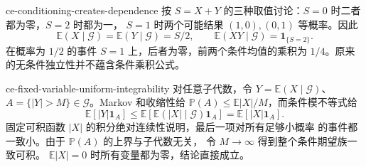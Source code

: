 \begin{solution}{ce-conditioning-creates-dependence}
按 $S=X+Y$ 的三种取值讨论：$S=0$ 时二者都为零，$S=2$ 时都为一，
$S=1$ 时两个可能结果 $(1,0),(0,1)$ 等概率。因此
\[
 \mathbb E(X\mid\mathcal G)=\mathbb E(Y\mid\mathcal G)=S/2,
 \qquad \mathbb E(XY\mid\mathcal G)=\mathbf1_{\{S=2\}}.
\]
在概率为 $1/2$ 的事件 $S=1$ 上，后者为零，前两个条件均值的乘积为
$1/4$。原来的无条件独立性并不蕴含条件乘积公式。
\end{solution}

\begin{solution}{ce-fixed-variable-uniform-integrability}
对任意子代数，令 $Y=\mathbb E(X\mid\mathcal G)$、
$A=\{|Y|>M\}\in\mathcal G$。Markov 和收缩性给
$\mathbb P(A)\le\mathbb E|X|/M$，而条件模不等式给
\[
 \mathbb E[|Y|\mathbf1_A]
 \le\mathbb E[\mathbb E(|X|\mid\mathcal G)\mathbf1_A]
 =\mathbb E[|X|\mathbf1_A].
\]
固定可积函数 $|X|$ 的积分绝对连续性说明，最后一项对所有足够小概率
的事件都一致小。由于 $\mathbb P(A)$ 的上界与子代数无关，
令 $M\to\infty$ 得到整个条件期望族一致可积。
$\mathbb E|X|=0$ 时所有变量都为零，结论直接成立。
\end{solution}
